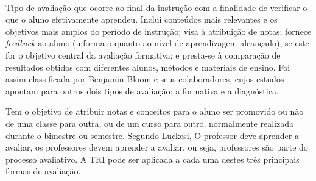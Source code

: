 	\paragraph{}
	    Tipo de avaliação que ocorre ao final da instrução com a finalidade de verificar o que o aluno efetivamente aprendeu. Inclui conteúdos mais relevantes e os objetivos mais amplos do período de instrução; visa à atribuição de notas; fornece \textit{feedback} ao aluno (informa-o quanto ao nível de aprendizagem alcançado), se este for o objetivo central da avaliação formativa; e presta-se à comparação de resultados obtidos com diferentes alunos, métodos e materiais de ensino. Foi assim classificada por Benjamin Bloom e seus colaboradores, cujos estudos apontam para outros dois tipos de avaliação: a formativa e a diagnóstica.\textcite{Takuno}
	\par
	    Tem o objetivo de atribuir notas e conceitos para o aluno ser promovido ou não de uma classe para outra, ou de um curso para outro, normalmente realizada durante o bimestre ou semestre.
		Segundo Luckesi, O professor deve aprender a avaliar, os professores devem aprender a avaliar, ou seja, professores são parte do processo avaliativo.
	    A TRI pode ser aplicada a cada uma destes três principais formas de avaliação.
	
	
	\newpage